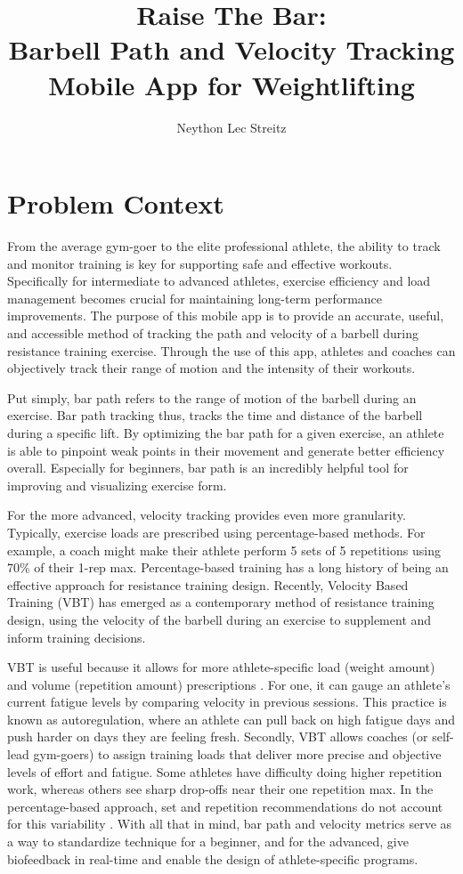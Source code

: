 \documentclass[10pt,twocolumn]{article}
\title{Raise The Bar: \\ Barbell Path and Velocity Tracking Mobile App for Weightlifting}
\author{Neython Lec Streitz}
\affiliation{Occidental College}
\begin{document}
\maketitle

\section{Problem Context}
From the average gym-goer to the elite professional athlete, the ability to track and monitor training is key for supporting safe and effective workouts. 
Specifically for intermediate to advanced athletes, exercise efficiency and load management becomes crucial for maintaining long-term performance improvements.
The purpose of this mobile app is to provide an accurate, useful, and accessible method of tracking the path and velocity of a barbell during resistance training exercise.
Through the use of this app, athletes and coaches can objectively track their range of motion and the intensity of their workouts. \par

Put simply, bar path refers to the range of motion of the barbell during an exercise. 
Bar path tracking thus, tracks the time and distance of the barbell during a specific lift. 
By optimizing the bar path for a given exercise, an athlete is able to pinpoint weak points in their movement and generate better efficiency overall. 
Especially for beginners, bar path is an incredibly helpful tool for improving and visualizing exercise form. \par

For the more advanced, velocity tracking provides even more granularity.
Typically, exercise loads are prescribed using percentage-based methods.
For example, a coach might make their athlete perform 5 sets of 5 repetitions using 70\% of their 1-rep max.
Percentage-based training has a long history of being an effective approach for resistance training design.
Recently, Velocity Based Training (VBT) has emerged as a contemporary method of resistance training design, using the velocity of the barbell during an exercise to supplement and inform training decisions. \par

VBT is useful because it allows for more athlete-specific load (weight amount) and volume (repetition amount) prescriptions \cite{Weakley2021}.
For one, it can gauge an athlete's current fatigue levels by comparing velocity in previous sessions.
This practice is known as autoregulation, where an athlete can pull back on high fatigue days and push harder on days they are feeling fresh.
Secondly, VBT allows coaches (or self-lead gym-goers) to assign training loads that deliver more precise and objective levels of effort and fatigue.
Some athletes have difficulty doing higher repetition work, whereas others see sharp drop-offs near their one repetition max. 
In the percentage-based approach, set and repetition recommendations do not account for this variability \cite{Balsalobre-Fernández2021}.
With all that in mind, bar path and velocity metrics serve as a way to standardize technique for a beginner, and for the advanced, give biofeedback in real-time and enable the design of athlete-specific programs. \par
\end{document}
